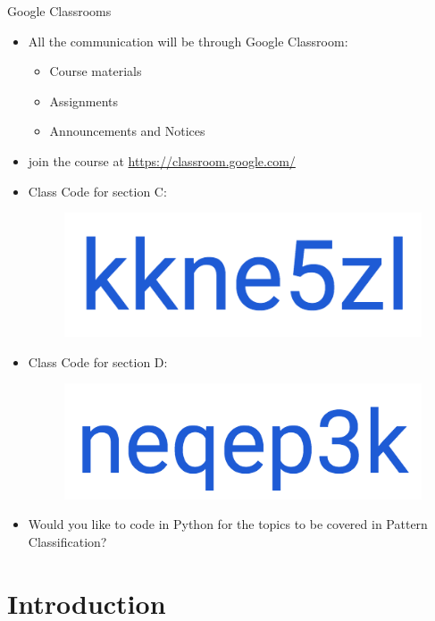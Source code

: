 \begin{frame}{Google Classrooms}
\begin{normalsize}
\begin{itemize}
\item All the communication will be through {\color{mycolor2}Google Classroom}:
\begin{itemize}
\item Course materials
\item Assignments
\item Announcements and Notices
\end{itemize}
\item join the course at {\color{blue}\url{https://classroom.google.com/}}
\item  {\color{mycolor2}Class Code} for section C: 
\begin{figure}
\centering
\includegraphics[scale=0.2]{Figures/courseCode}
\end{figure}
\item  {\color{mycolor2}Class Code} for section D: 
\begin{figure}
\centering
\includegraphics[scale=0.2]{Figures/ClassCode_ECE-D}
\end{figure}
\item Would you like to {\color{mycolor1}code in Python} for the topics to be covered in Pattern Classification?
\end{itemize}
\end{normalsize}
\end{frame}


\section{Introduction}
